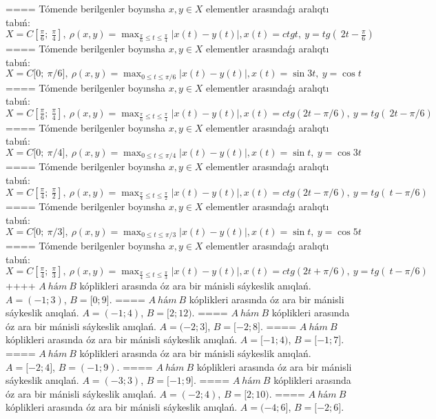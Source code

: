 ====
Tómende berilgenler boyınsha \(x,y \in X\) elementler arasındaǵı aralıqtı tabıń: \(X = C\left\lbrack \frac{\pi}{6};\ \frac{\pi}{4} \right\rbrack,\ \rho(x,y) = \max _{\frac{\pi}{6} \leq t \leq \frac{\pi}{4}}|x(t) - y(t)|,x(t) = ctgt,\ y = tg(\ 2t - \frac{\pi}{6})\)
====
Tómende berilgenler boyınsha \(x,y \in X\) elementler arasındaǵı aralıqtı tabıń: \(X = C\lbrack 0;\ \pi/6\rbrack,\ \rho(x,y) = \max _{0 \leq t \leq \pi/6}|x(t) - y(t)|,x(t) = \sin3t,\ y = \cos t\)
====
Tómende berilgenler boyınsha \(x,y \in X\) elementler arasındaǵı aralıqtı tabıń: \(X = C\left\lbrack \frac{\pi}{6};\ \frac{\pi}{4} \right\rbrack,\ \rho(x,y) = \max _{\frac{\pi}{6} \leq t \leq \frac{\pi}{4}}|x(t) - y(t)|,x(t) = ctg(2t - \pi/6),\ y = tg(\ 2t - \pi/6)\)
====
Tómende berilgenler boyınsha \(x,y \in X\) elementler arasındaǵı aralıqtı tabıń: \(X = C\lbrack 0;\ \pi/4\rbrack,\ \rho(x,y) = \max _{0 \leq t \leq \pi/4}|x(t) - y(t)|,x(t) = \sin t,\ y = \cos3t\)
====
Tómende berilgenler boyınsha \(x,y \in X\) elementler arasındaǵı aralıqtı tabıń: \(X = C\left\lbrack \frac{\pi}{4};\ \frac{\pi}{2} \right\rbrack,\ \rho(x,y) = \max _{\frac{\pi}{4} \leq t \leq \frac{\pi}{2}}|x(t) - y(t)|,x(t) = ctg(2t - \pi/6),\ y = tg(\ t - \pi/6)\)
====
Tómende berilgenler boyınsha \(x,y \in X\) elementler arasındaǵı aralıqtı tabıń: \(X = C\lbrack 0;\ \pi/3\rbrack,\ \rho(x,y) = \max _{0 \leq t \leq \pi/3}|x(t) - y(t)|,x(t) = \sin t,\ y = \cos5t\)
====
Tómende berilgenler boyınsha \(x,y \in X\) elementler arasındaǵı aralıqtı tabıń: \(X = C\left\lbrack \frac{\pi}{4};\ \frac{\pi}{3} \right\rbrack,\ \rho(x,y) = \max _{\frac{\pi}{4} \leq t \leq \frac{\pi}{3}}|x(t) - y(t)|,x(t) = ctg(2t + \pi/6),\ y = tg(\ t - \pi/6)\)
++++
\(A\ hám\ B\) kóplikleri arasında óz ara bir mánisli sáykeslik anıqlań. \(A = ( - 1;3)\), \(B = \lbrack 0;9\rbrack\).
====
\(A\ hám\ B\) kóplikleri arasında óz ara bir mánisli sáykeslik anıqlań. \(A = ( - 1;4)\), \(B = \lbrack 2;12)\).
====
\(A\ hám\ B\) kóplikleri arasında óz ara bir mánisli sáykeslik anıqlań. \(A = ( - 2;3\rbrack\), \(B = \lbrack - 2;8\rbrack\).
====
\(A\ hám\ B\) kóplikleri arasında óz ara bir mánisli sáykeslik anıqlań. \(A = \lbrack - 1;4)\), \(B = \lbrack - 1;7\rbrack\).
====
\(A\ hám\ B\) kóplikleri arasında óz ara bir mánisli sáykeslik anıqlań. \(A = \lbrack - 2;4\rbrack\), \(B = ( - 1;9)\).
====
\(A\ hám\ B\) kóplikleri arasında óz ara bir mánisli sáykeslik anıqlań. \(A = ( - 3;3)\), \(B = \lbrack - 1;9\rbrack\).
====
\(A\ hám\ B\) kóplikleri arasında óz ara bir mánisli sáykeslik anıqlań. \(A = ( - 2;4)\), \(B = \lbrack 2;10)\).
====
\(A\ hám\ B\) kóplikleri arasında óz ara bir mánisli sáykeslik anıqlań. \(A = ( - 4;6\rbrack\), \(B = \lbrack - 2;6\rbrack\).
